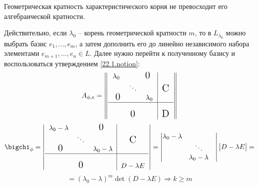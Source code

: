   \begin{lemm}
  Геометрическая кратность характеристического корня не превосходит его алгебраической кратности.
  \end{lemm}
  Действительно, если $\lambda_0$ -- корень геометрической кратности $m$, то в $L_{\lambda_0}$ можно выбрать базис $e_1,...,e_m$, а затем дополнить его до линейно независимого набора элементами $e_{m+1},...,e_n \in L$. Далее нужно перейти к полученному базису и воспользоваться утверждением \ref{22.1.notion}:
  \begin{equation*}
  A_{\phi,e}=
  \begin{Vmatrix}
    \begin{tabular}{ccc|c}
      $\lambda_0$ & 			&$\fudge{0 }$& \\
      			& $\ddots$ 	& 			& $\fudge C$ \\
      $\fudge{ 0}$&			& $\lambda_0$ & \\ \hline
      			&  			& 			& \\
      			& $\fudge 0$ 	& 			& $\fudge D$ \\
    \end{tabular} 
  \end{Vmatrix} 
  \end{equation*}
  \begin{equation*}
  \bigchi_\phi=
  \begin{vmatrix}
    \begin{tabular}{ccc|c}
      $\lambda_0-\lambda$ & 			&$\fudge{0 }$ 			& \\
      			& $\ddots$ 	& 			& $\fudge C$ \\
      $\fudge{ 0}$&			& $\lambda_0-\lambda$ & \\ \hline
      			&  			& 			& \\
      			& $\fudge 0$ 	& 			& $ D-\lambda E$ \\
    \end{tabular} 
  \end{vmatrix} = \begin{vmatrix}
        \lambda_0-\lambda & 			& \\
      			& \ddots 	&  \\
      			& \lambda_0-\lambda & \\ 
  \end{vmatrix} \begin{vmatrix}
  D-\lambda E
  \end{vmatrix}=
  \end{equation*}
  \begin{equation}
  =(\lambda_0-\lambda)^m \det(D-\lambda E) \Rightarrow k \ge m
  \end{equation}
